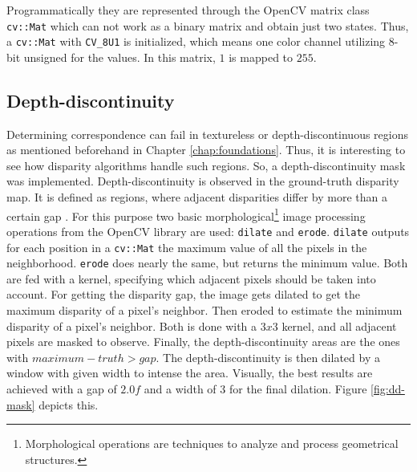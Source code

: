 \noindent Programmatically they are represented through the OpenCV matrix class \texttt{cv::Mat} which can not work as a binary matrix and obtain just two states.
Thus, a \texttt{cv::Mat} with \texttt{CV\_8U1} is initialized, which means one color channel utilizing 8-bit unsigned for the values.
In this matrix, $1$ is mapped to $255$.

\subsection*{Depth-discontinuity}

Determining correspondence can fail in textureless or depth-discontinuous regions as mentioned beforehand in Chapter \ref{chap:foundations}.
Thus, it is interesting to see how disparity algorithms handle such regions.
So, a depth-discontinuity mask was implemented.
Depth-discontinuity is observed in the ground-truth disparity map.
It is defined as regions, where adjacent disparities differ by more than a certain gap \citep{scharstein2002taxonomy, cyganek2011introduction}.
For this purpose two basic morphological\footnote{Morphological operations are techniques to analyze and process geometrical structures.} image processing operations from the OpenCV library are used: \texttt{dilate} and \texttt{erode}.
\texttt{dilate} outputs for each position in a \texttt{cv::Mat} the maximum value of all the pixels in the neighborhood.
\texttt{erode} does nearly the same, but returns the minimum value.
Both are fed with a kernel, specifying which adjacent pixels should be taken into account.
\newline\newline\noindent For getting the disparity gap, the image gets dilated to get the maximum disparity of a pixel's neighbor.
Then eroded to estimate the minimum disparity of a pixel's neighbor.
Both is done with a $3x3$ kernel, and all adjacent pixels are masked to observe.
Finally, the depth-discontinuity areas are the ones with $maximum - truth > gap$.
The depth-discontinuity is then dilated by a window with given width to intense the area.
Visually, the best results are achieved with a gap of $2.0f$ and a width of $3$ for the final dilation.
Figure \ref{fig:dd-mask} depicts this.


